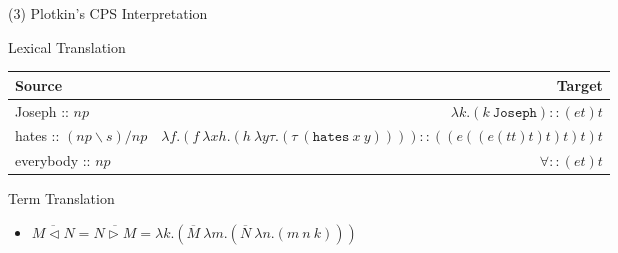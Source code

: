 \documentclass{beamer}
\newcommand{\term}[1]{\texttt{#1}}
\begin{document}
\begin{frame}{(3) Plotkin's CPS Interpretation}
	\small
	\begin{center}
	\alert{Lexical Translation}\\
	{\footnotesize
	\begin{tabularx}{1.05\textwidth}{@{}lr@{}}
	Source &  Target\\
	\toprule
	 Joseph :: $np$ & $\lambda k.(k \ \term{Joseph}):: (et)t$\\
	 hates :: $(np\backslash s)/np$ & 
	 $\lambda f.(f \ \lambda xh.(h \ \lambda y\tau.(\tau \ (\term{hates}\ x\ y)))) :: ( ( e((e(tt)t) t)t )t)t$ \\
	 everybody :: $np$ & $\forall :: (et)t$
	\end{tabularx}
	}
	\end{center}\vfill
	
	\pause
	\alert{Term Translation}\\
	\begin{itemize}
		\item[] $\overline{M \triangleleft N} = \overline{N \triangleright M} = \lambda k.(\overline{M} \ \lambda m.(\overline{N} \ \lambda n.(m \ n \ k)))$
	\end{itemize}
	

\end{frame}
\end{document}
